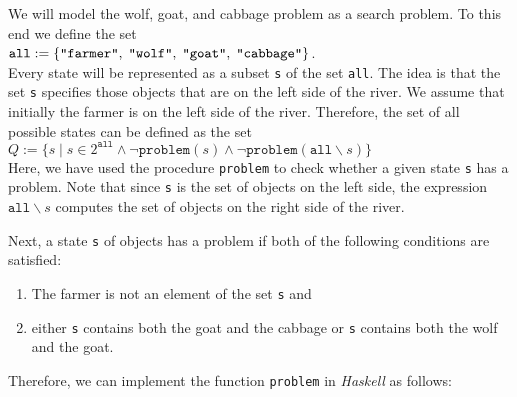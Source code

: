 \noindent
We will model the wolf, goat, and cabbage problem as a search problem.
To this end we define the set
\\[0.2cm]
\hspace*{1.3cm} 
$\texttt{all} := \{ \squote{farmer},\; \squote{wolf},\; \squote{goat},\; \squote{cabbage} \}$.
\\[0.2cm]
Every state will be represented as a subset \texttt{s} of the set \texttt{all}.  The idea is that the set \texttt{s}
specifies those objects that are on the left side of the river.  We assume that initially the farmer
is on the left side of the river. 
Therefore, the set of all possible states can be defined as the set
\\[0.2cm]
\hspace*{1.3cm}
$Q := \bigl\{ s \mid s \in 2^{\mathtt{all}} \wedge \neg \mathtt{problem}(s) \wedge \neg \mathtt{problem}(\mathtt{all} \backslash s) \bigl\}$
\\[0.2cm]
Here, we have used the procedure \texttt{problem} to check whether a given state \texttt{s} has a problem. 
Note that since \texttt{s} is the set of objects on the left side, the expression $\texttt{all} \backslash s$
computes the set of objects on the right side of the river.

Next, a state \texttt{s} of objects has a problem if both of the following conditions
are satisfied:
\begin{enumerate}
\item The farmer is not an element of the set \texttt{s} and
\item either \texttt{s} contains both the goat and the cabbage or \texttt{s} contains both the wolf and the goat.
\end{enumerate}
Therefore, we can implement the function \texttt{problem} in \textsl{Haskell} as follows:

